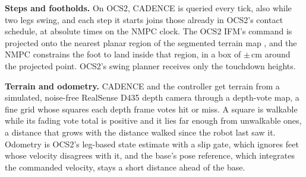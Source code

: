 \noindent\textbf{Steps and footholds.}
 On OCS2, CADENCE is queried every tick, also while two legs
swing, and each step it starts joins those already in OCS2's contact
schedule, at absolute times on the NMPC clock. The OCS2 IFM's
command is projected onto the nearest planar region of the segmented
terrain map \citep{grandia_perceptive_2022}, and the NMPC constrains
the foot to land inside that region, in a box of
$\pm$\corlAuthorityCm\,cm around the projected point. OCS2's swing
planner receives only the touchdown heights.

\noindent\textbf{Terrain and odometry.}
 CADENCE and the controller get terrain from a simulated,
noise-free RealSense D435 depth camera through a depth-vote map, a fine
grid whose squares each depth frame votes hit or miss. A square is
walkable while its fading vote total is positive and it lies far enough
from unwalkable ones, a distance that grows with the distance walked
since the robot last saw it. Odometry is OCS2's leg-based state
estimate with a slip gate, which ignores feet whose velocity disagrees
with it, and the base's pose reference, which integrates the commanded
velocity, stays a short distance ahead of the base.






